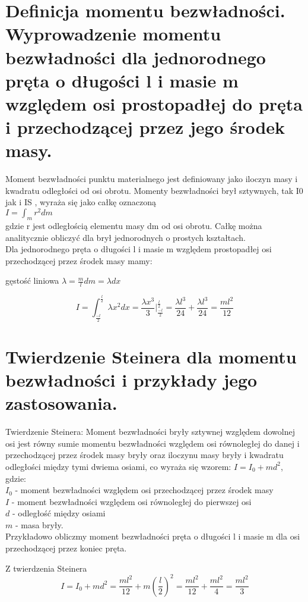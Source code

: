 \documentclass[a4paper,11pt]{article} %
\begin{document}
\section{Definicja momentu bezwładności. Wyprowadzenie momentu bezwładności
dla jednorodnego pręta o długości l i masie m względem osi prostopadłej
do pręta i przechodzącej przez jego środek masy.}

Moment bezwładności punktu materialnego jest definiowany
jako iloczyn masy i kwadratu odległości od osi obrotu. Momenty bezwładności brył
sztywnych, tak I0 jak i IS , wyraża się jako całkę oznaczoną\\
$I = \int_m r^2 dm$\\
gdzie r jest odległością elementu masy dm od osi obrotu. Całkę można analitycznie
obliczyć dla brył jednorodnych o prostych kształtach.
\\
Dla jednorodnego pręta o długości l i masie m względem prostopadłej osi przechodzącej przez środek masy mamy:\\
\begin{center}
gęstość liniowa $ \lambda = \frac{m}{l} dm = \lambda dx $
\end{center}
$$ I = \int_{\frac{-l}{2}}^{\frac{l}{2}} \lambda x^2 dx = \frac{\lambda x^3}{3}|_{\frac{-l}{2}}^{\frac{l}{2}} = \frac{\lambda l^3}{24} + \frac{\lambda l^3}{24} = \frac{ml^2}{12}$$

\section{Twierdzenie Steinera dla momentu bezwładności i przykłady jego
zastosowania.}
Twierdzenie Steinera: Moment bezwładności bryły sztywnej względem dowolnej osi jest równy sumie momentu bezwładności względem osi równoległej do danej i przechodzącej przez środek masy bryły oraz iloczynu masy bryły i kwadratu odległości między tymi dwiema osiami, co wyraża się wzorem: $I = I_0 + md^2$, gdzie: \\
$I_0$ - moment bezwładności względem osi przechodzącej przez środek masy\\
$I$ - moment bezwładności względem osi równoległej do pierwszej osi\\
$d$ - odległość między osiami\\
$m$ - masa bryły.\\

Przykładowo obliczmy moment bezwładności pręta o długości l i masie m dla osi przechodzącej przez koniec pręta.

Z twierdzenia Steinera $$I = I_0 + md^2 = \frac{ml^2}{12} + m (\frac{l}{2})^2 =  \frac{ml^2}{12} +  \frac{ml^2}{4} =  \frac{ml^2}{3}$$
\end{document}
